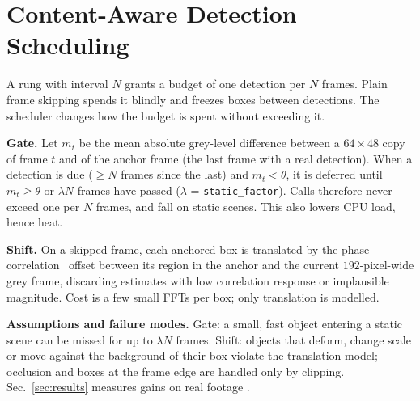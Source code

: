\section{Content-Aware Detection Scheduling}\label{sec:sched}
A rung with interval $N$ grants a budget of one detection per $N$ frames.
Plain frame skipping spends it blindly and freezes boxes between detections.
The scheduler changes how the budget is spent without exceeding it.

\textbf{Gate.} Let $m_t$ be the mean absolute grey-level difference between a
$64{\times}48$ copy of frame $t$ and of the anchor frame (the last frame with a
real detection). When a detection is due ($\ge N$ frames since the last) and
$m_t<\theta$, it is deferred until $m_t\ge\theta$ or $\lambda N$ frames have
passed ($\lambda$ = \texttt{static\_factor}). Calls therefore never exceed one per $N$
frames, and fall on static scenes. This also lowers CPU load, hence heat.

\textbf{Shift.} On a skipped frame, each anchored box is translated by the
phase-correlation~\cite{kuglin1975phase} offset between its region in the
anchor and the current $192$-pixel-wide grey frame, discarding estimates with low
correlation response or implausible magnitude. Cost is a few small FFTs per box;
only translation is modelled.

\textbf{Assumptions and failure modes.} Gate: a small, fast object entering a
static scene can be missed for up to $\lambda N$ frames. Shift: objects that deform,
change scale or move against the background of their box violate the translation
model; occlusion and boxes at the frame edge are handled only by clipping.
Sec.~\ref{sec:results} measures gains on real footage .
